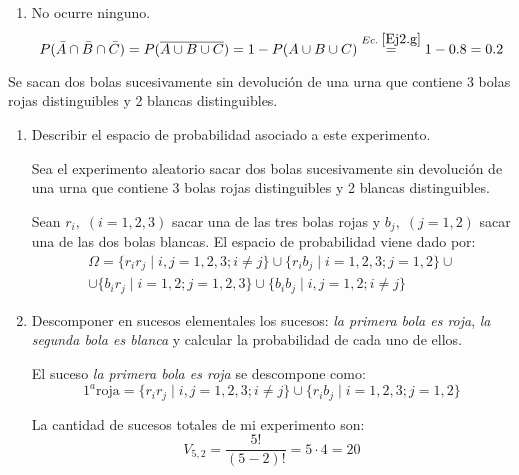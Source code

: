 \begin{ejercicio}
\begin{enumerate}
        \item No ocurre ninguno.
        \begin{equation*}
            P(\bar{A} \cap \bar{B} \cap \bar{C}) = P(\overline{A\cup B \cup C}) = 1-P(A\cup B \cup C) \stackrel{Ec.\;\ref{Ej2.g}}{=} 1-0.8 = 0.2
        \end{equation*}
    \end{enumerate}
\end{ejercicio}

\begin{ejercicio} \label{ej:3.Ejercicio3}
    Se sacan dos bolas sucesivamente sin devolución de una urna que contiene 3 bolas rojas distinguibles y 2 blancas distinguibles.
    \begin{enumerate}
        \item Describir el espacio de probabilidad asociado a este experimento.

        Sea el experimento aleatorio sacar dos bolas sucesivamente sin devolución de una urna que contiene 3 bolas rojas distinguibles y 2 blancas distinguibles.

        Sean $r_{i},\;(i=1,2,3)$ sacar una de las tres bolas rojas y $b_{j},\;(j=1,2)$ sacar una de las dos bolas blancas. El espacio de probabilidad viene dado por:
        \begin{multline*}
            \Omega =
            \lbrace r_{i}r_{j}\mid i, j = 1, 2, 3; i \neq j \rbrace
            \cup
            \lbrace r_{i} b_{j}\mid i=1, 2, 3 ; j = 1, 2 \rbrace
            \cup\\\cup
            \lbrace b_{i} r_{j}\mid i = 1, 2 ; j = 1, 2, 3 \rbrace
            \cup
            \lbrace b_{i} b_{j}\mid i, j = 1, 2; i \neq j \rbrace
        \end{multline*}
        
        \item Descomponer en sucesos elementales los sucesos: \textit{la primera bola es roja}, \textit{la segunda bola es blanca} y calcular la probabilidad de cada uno de ellos.

        El suceso \textit{la primera bola es roja} se descompone como:
        \begin{equation*}
            1^a\text{roja}=\lbrace r_{i}r_{j}\mid i, j = 1, 2, 3; i \neq j \rbrace
            \cup
            \lbrace r_{i} b_{j}\mid i=1, 2, 3 ; j = 1, 2 \rbrace
        \end{equation*}

        La cantidad de sucesos totales de mi experimento son:
        \begin{equation*}
            V_{5,2}=\frac{5!}{(5-2)!}=5\cdot 4 = 20
        \end{equation*}


\end{enumerate}
\end{ejercicio}
